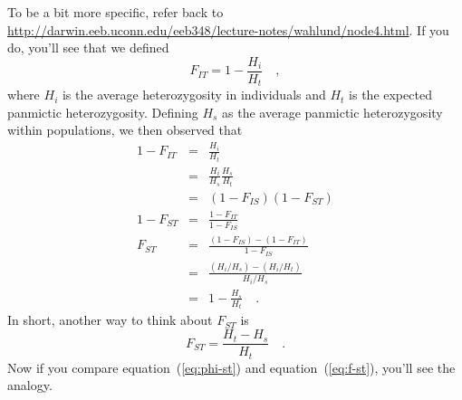 \documentclass[12pt]{article}
\begin{document}
To be a bit more specific, refer back to
\url{http://darwin.eeb.uconn.edu/eeb348/lecture-notes/wahlund/node4.html}.
If you do, you'll see that we defined
\[
F_{IT} = 1 - \frac{H_i}{H_t} \quad ,
\]
where $H_i$ is the average heterozygosity in individuals and $H_t$ is
the expected panmictic heterozygosity. Defining $H_s$ as the average
panmictic heterozygosity within populations, we then observed that
\begin{eqnarray*}
1 - F_{IT} &=& \frac{H_i}{H_t} \\
           &=& \frac{H_i}{H_s}\frac{H_s}{H_t} \\
           &=& (1 - F_{IS})(1 - F_{ST}) \\
1-F_{ST} &=& \frac{1-F_{IT}}{1-F_{IS}} \\
F_{ST} &=&
\frac{\left(1-F_{IS}\right)-\left(1-F_{IT}\right)}{1-F_{IS}} \\
&=& \frac{\left(H_i/H_s\right) - \left(H_i/H_t\right)}{H_i/H_s} \\
&=& 1 - \frac{H_s}{H_t} \quad .
\end{eqnarray*}
In short, another way to think about $F_{ST}$ is
\begin{equation}
F_{ST} = \frac{H_t - H_s}{H_t} \quad .
\label{eq:f-st}
\end{equation}
Now if you compare equation~(\ref{eq:phi-st}) and
equation~(\ref{eq:f-st}), you'll see the analogy.
\end{document}
